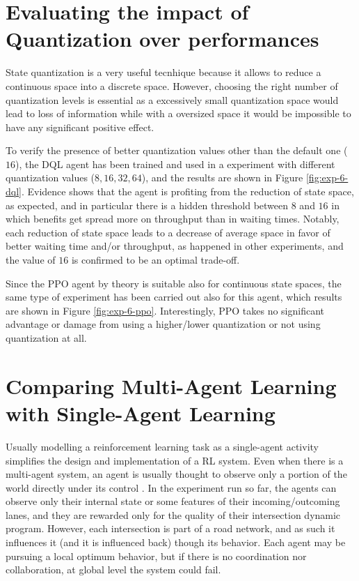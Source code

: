 \newpage
\section{Evaluating the impact of Quantization over performances}

State quantization is a very useful tecnhique because it allows to reduce a continuous space into a discrete space. However, choosing the right number of quantization levels is essential as a excessively small quantization space would lead to loss of information while with a oversized space it would be impossible to have any significant positive effect.

To verify the presence of better quantization values other than the default one ($16$), the DQL agent has been trained and used in a experiment with different quantization values ($8, 16, 32, 64$), and the results are shown in Figure \ref{fig:exp-6-dql}.
Evidence shows that the agent is profiting from the reduction of state space, as expected, and in particular there is a hidden threshold between $8$ and $16$ in which benefits get spread more on throughput than in waiting times.
Notably, each reduction of state space leads to a decrease of average space in favor of better waiting time and/or throughput, as happened in other experiments, and the value of $16$ is confirmed to be an optimal trade-off.

Since the PPO agent by theory is suitable also for continuous state spaces, the same type of experiment has been carried out also for this agent, which results are shown in Figure \ref{fig:exp-6-ppo}.
Interestingly, PPO takes no significant advantage or damage from using a higher/lower quantization or not using quantization at all.



\section{Comparing Multi-Agent Learning with Single-Agent Learning}

Usually modelling a reinforcement learning task as a single-agent activity simplifies the design and implementation of a RL system.
Even when there is a multi-agent system, an agent is usually thought to observe only a portion of the world directly under its control \cite{alegre2021quantifying}.
In the experiment run so far, the agents can observe only their internal state or some features of their incoming/outcoming lanes, and they are rewarded only for the quality of their intersection dynamic program.
However, each intersection is part of a road network, and as such it influences it (and it is influenced back) though its behavior.
Each agent may be pursuing a local optimum behavior, but if there is no coordination nor collaboration, at global level the system could fail.

